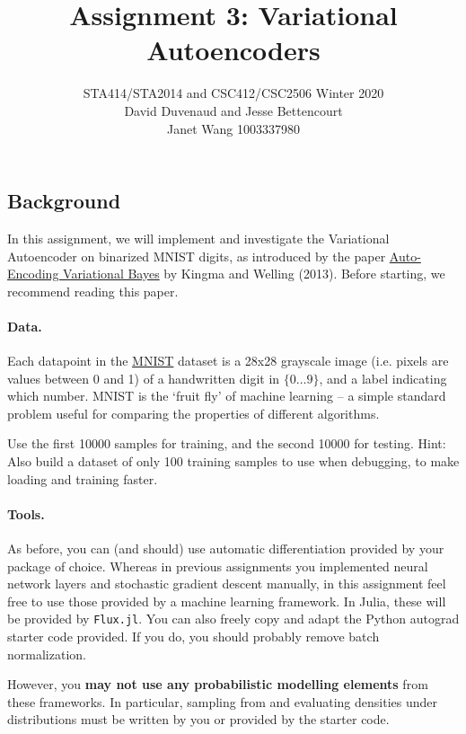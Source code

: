 \documentclass{article}
\begin{document}
\title{Assignment 3: Variational Autoencoders}
\author{STA414/STA2014 and CSC412/CSC2506 Winter 2020\\
  David Duvenaud and Jesse Bettencourt\\
  Janet Wang 1003337980
}
\maketitle



\subsection{Background}
In this assignment, we will implement and investigate the Variational Autoencoder on binarized MNIST digits, as introduced by the paper \href{https://arxiv.org/pdf/1312.6114.pdf}{Auto-Encoding Variational Bayes} by Kingma and Welling (2013). Before starting, we recommend reading this paper.

\paragraph{Data.}
Each datapoint in the \href{http://yann.lecun.com/exdb/mnist/}{MNIST} dataset is a 28x28 grayscale image (i.e. pixels are values between 0 and 1) of a handwritten digit in $\{0 \dots 9\}$, and a label indicating which number.
MNIST is the `fruit fly' of machine learning -- a simple standard problem useful for comparing the properties of different algorithms.

Use the first 10000 samples for training, and the second 10000 for testing.
Hint: Also build a dataset of only 100 training samples to use when debugging, to make loading and training faster.

\paragraph{Tools.}
As before, you can (and should) use automatic differentiation provided by your package of choice.
Whereas in previous assignments you implemented neural network layers and stochastic gradient descent manually, in this assignment feel free to use those provided by a machine learning framework.
In Julia, these will be provided by \texttt{Flux.jl}.
You can also freely copy and adapt the Python autograd starter code provided.  
If you do, you should probably remove batch normalization.

However, you \textbf{may not use any probabilistic modelling elements} from these frameworks.
In particular, sampling from and evaluating densities under distributions must be written by you or provided by the starter code.
\end{document}
